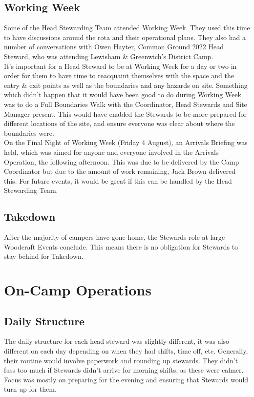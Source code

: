 \subsection{Working Week}
Some of the Head Stewarding Team attended Working Week. They used this time to have discussions around the rota and their operational plans. They also had a number of conversations with Owen Hayter, Common Ground 2022 Head Steward, who was attending Lewisham \& Greenwich's District Camp. \\

It's important for a Head Steward to be at Working Week for a day or two in order for them to have time to reacquaint themselves with the space and the entry \& exit points as well as the boundaries and any hazards on site. Something which didn't happen that it would have been good to do during Working Week was to do a Full Boundaries Walk with the Coordinator, Head Stewards and Site Manager present. This would have enabled the Stewards to be more prepared for different locations of the site, and ensure everyone was clear about where the boundaries were. \\

On the Final Night of Working Week (Friday 4 August), an Arrivals Briefing was held, which was aimed for anyone and everyone involved in the Arrivals Operation, the following afternoon. This was due to be delivered by the Camp Coordinator but due to the amount of work remaining, Jack Brown delivered this. For future events, it would be great if this can be handled by the Head Stewarding Team. 

\subsection{Takedown}
After the majority of campers have gone home, the Stewards role at large Woodcraft Events conclude. This means there is no obligation for Stewards to stay behind for Takedown. 

\section{On-Camp Operations}
\subsection{Daily Structure}
The daily structure for each head steward was slightly different, it was also different on each day depending on when they had shifts, time off, etc. Generally, their routine would involve paperwork and rounding up stewards. They didn't fuss too much if Stewards didn't arrive for morning shifts, as these were calmer. Focus was mostly on preparing for the evening and ensuring that Stewards would turn up for them. 


